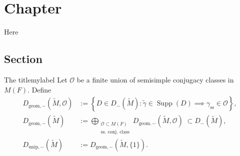 \documentclass[11pt, a4paper, openany]{book}
\newenvironment{Proof of claim}
  {\renewcommand\qedsymbol{$\blacksquare$}\begin{proof}[Proof of claim]}
  {\end{proof}}
\newcommand{\Supp}{\operatorname{Supp}}
\theoremstyle{remark}
\theoremstyle{remark}
\theoremstyle{remark}
\theoremstyle{remark}
\begin{document}
\chapter{Chapter}

Here

\section{Section}

\begin{Definition}{The title}{mylabel}
	Let $\mathcal{O}$ be a finite union of semisimple conjugacy classes in $M(F)$. Define
	\begin{align*}
		D_{\mathrm{geom},-}(\tilde{M}, \mathcal{O}) & := \left\{ D \in D_-(\tilde{M}) : \tilde{\gamma} \in \Supp(D) \implies \gamma_{\text{ss}} \in \mathcal{O} \right\}, \\
		D_{\mathrm{geom}, -}(\tilde{M}) & := \bigoplus_{\substack{\mathcal{O} \subset M(F) \\ \text{ss.\ conj.\ class} }} D_{\mathrm{geom},-}(\tilde{M}, \mathcal{O}) \; \subset D_-(\tilde{M}), \\
		D_{\mathrm{unip}, -}(\tilde{M}) & := D_{\mathrm{geom}, -}(\tilde{M}, \{1\}).
	\end{align*}
\end{Definition}
\end{document}
